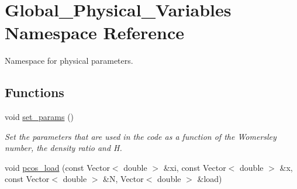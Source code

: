 \hypertarget{namespaceGlobal__Physical__Variables}{}\section{Global\+\_\+\+Physical\+\_\+\+Variables Namespace Reference}
\label{namespaceGlobal__Physical__Variables}


Namespace for physical parameters.  


\subsection*{Functions}
\begin{DoxyCompactItemize}
\item 
void \hyperlink{namespaceGlobal__Physical__Variables_a5928252d8e7440b329065c223926d4d2}{set\+\_\+params} ()
\begin{DoxyCompactList}\small\item\em Set the parameters that are used in the code as a function of the Womersley number, the density ratio and H. \end{DoxyCompactList}\item 
void \hyperlink{namespaceGlobal__Physical__Variables_aa08c246eac99f59be33ef4a6ee924990}{pcos\+\_\+load} (const Vector$<$ double $>$ \&xi, const Vector$<$ double $>$ \&x, const Vector$<$ double $>$ \&N, Vector$<$ double $>$ \&load)
\end{DoxyCompactItemize}
